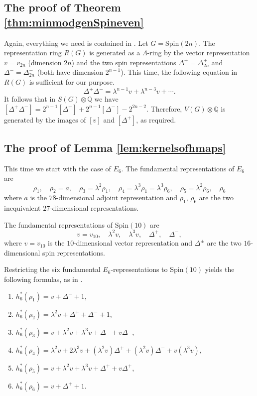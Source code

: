 \documentclass[twoside,a4paper,reqno,11pt]{amsart}
\newcommand{\Q}{\mathbb{Q}}
\newcommand{\Spin}{\mathrm{Spin}}
\begin{document}
\subsection{The proof of Theorem \ref{thm:minmodgenSpineven}}

Again, everything we need is contained in \cite[Theorem~10.3]{MR1249482}. Let $G = \Spin(2n)$. The representation ring $R(G)$ is generated as a $\Lambda$-ring by the vector representation $v = v_{2n}$ (dimension $2n$) and the two spin representations $\Delta^+ = \Delta^+_{2n}$ and $\Delta^- = \Delta^-_{2n}$ (both have dimension $2^{n-1}$). This time, the following equation in $R(G)$ is sufficient for our purpose. 
\[ \Delta^+ \Delta^- = \lambda^{n-1} v + \lambda^{n-3} v + \cdots . \]
It follows that in $S(G) \otimes \Q$ we have $[\Delta^+ \Delta^-] = 2^{n-1}[\Delta^+] + 2^{n-1}[\Delta^-] - 2^{2n-2}$. Therefore, $V(G) \otimes \Q$ is generated by the images of $[v]$ and $[\Delta^+]$, as required.  

\subsection{The proof of Lemma \ref{lem:kernelsofhmaps}}

This time we start with the case of $E_6$. The fundamental representations of $E_6$ are
\[ \rho_1, \quad \rho_2 = a, \quad \rho_3 = \lambda^2 \rho_1, \quad \rho_4 = \lambda^3 \rho_1 = \lambda^3 \rho_6,\quad \rho_5 = \lambda^2\rho_6, \quad \rho_6\]
where $a$ is the $78$-dimensional adjoint representation and $\rho_1$, $\rho_6$ are the two inequivalent $27$-dimensional representations. 


The fundamental representations of $\Spin(10)$ are
\[ v = v_{10}, \quad \lambda^2 v, \quad \lambda^3 v, \quad \Delta^+, \quad \Delta^-,\]
where $v = v_{10}$ is the $10$-dimensional vector representation and $\Delta^{\pm}$ are the two $16$-dimensional spin representations. 

Restricting the six fundamental $E_6$-representations to $\Spin(10)$ yields the following formulas, as in \cite[Lemma~2]{MR0440584}. 
\begin{enumerate}
\item
$h_6^*(\rho_1) =  v +  \Delta^- +1$,
\item 
$h_6^*(\rho_2) = \lambda^2 v + \Delta^+ + \Delta^- + 1$,
\item
$h_6^*(\rho_3) = v + \lambda^2 v + \lambda^3 v +  \Delta^- + v \Delta^-$,
\item
$h_6^*(\rho_4) = \lambda^2 v + 2\lambda^3 v + (\lambda^2 v) \Delta^+ + (\lambda^2 v) \Delta^- + v (\lambda^3 v)$,
\item
$h_6^*(\rho_5) = v + \lambda^2 v + \lambda^3 v +  \Delta^+ + v \Delta^+$,
\item
$h_6^*(\rho_6) =  v +  \Delta^+ +1$.
\end{enumerate}
\end{document}
